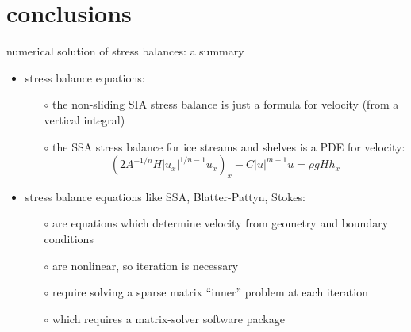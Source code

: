 
\section{conclusions}

\begin{frame}{numerical solution of stress balances: a summary}

\begin{itemize}
\item \alert{stress balance equations}:
  \begin{itemize}
  \item[$\circ$] the non-sliding SIA stress balance is just a formula for velocity (from a vertical integral)
  \item[$\circ$] the SSA stress balance for ice streams and shelves is a PDE for velocity:
  $$\left(2 A^{-1/n} H |u_x|^{1/n - 1} u_x\right)_x - C|u|^{m-1}u = \rho g H h_x$$
  \end{itemize}

\bigskip
\item stress balance equations like SSA, Blatter-Pattyn, Stokes:
  \begin{itemize}
  \item[$\circ$] are equations which determine velocity from geometry and boundary conditions
  \item[$\circ$] are \alert{nonlinear}, so iteration is necessary
  \item[$\circ$] require solving a sparse matrix ``inner'' problem at each iteration
  \item[$\circ$] which requires a matrix-solver software package
  \end{itemize}
\end{itemize}
\end{frame}


